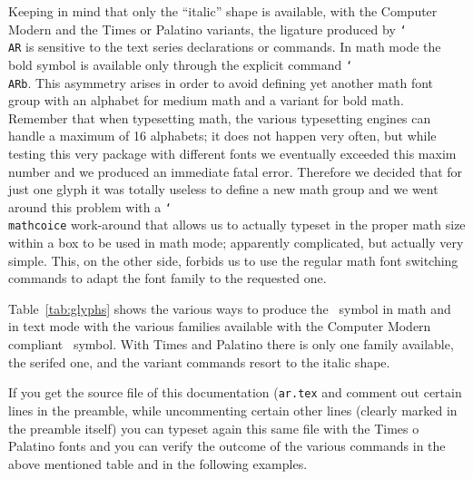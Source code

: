 \documentclass[a4paper]{article}
\newcommand\cs[1]{\texttt{\char`\\#1}}
\newcommand\file[1]{\texttt{#1}}
\begin{document}
Keeping in mind that only the ``italic'' shape is available, with the Computer Modern and the Times or Palatino variants, the ligature produced by \cs{AR} is sensitive to the text series declarations or commands.  In math mode the bold symbol is available only through the explicit command \cs{ARb}. This asymmetry arises in order to avoid defining yet another math font group with an alphabet for medium math and a variant for bold math. Remember that when typesetting math, the various typesetting engines can handle a maximum of 16 alphabets; it does not happen very often, but while testing this very package with different fonts we eventually exceeded this maxim number and we produced an immediate fatal error. Therefore we decided that for just one glyph it was totally useless to define a new math group and we went around this problem with a \cs{mathcoice} work-around that allows us to actually typeset in the proper math size within a box to be used in math mode; apparently complicated, but actually very simple. This, on the other side, forbids us to use the regular math font switching commands to adapt the font family to the requested one.

Table~\ref{tab:glyphs} shows the various ways to produce the \AR\ symbol in math and in text mode with the various families available with the Computer Modern compliant \AR\ symbol. With Times and Palatino there is only one family available, the serifed one, and the variant commands resort to the italic shape.

If you get the source file of this documentation (\file{ar.tex} and comment out certain lines in the preamble, while uncommenting certain other lines (clearly marked in the preamble itself) you can typeset again this same file with the Times o Palatino fonts and you can verify the outcome of the various commands in the above mentioned table and in the following examples.
\end{document}
